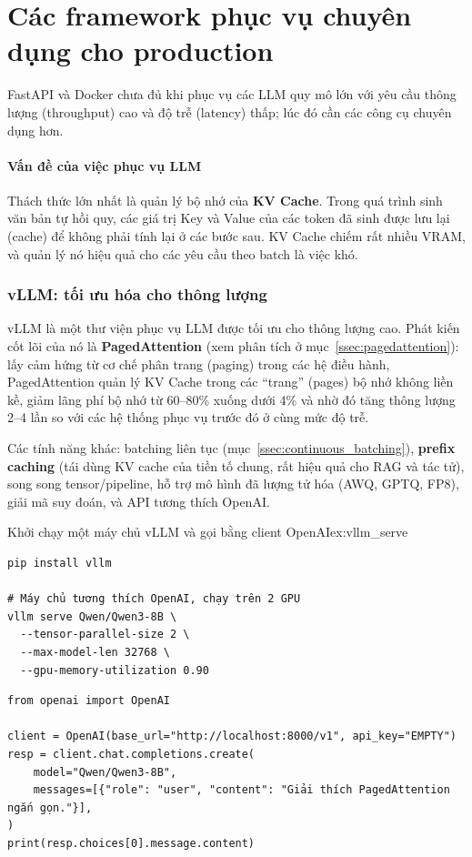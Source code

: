
\section{Các framework phục vụ chuyên dụng cho production}
\label{sec:specialized_serving_frameworks}
FastAPI và Docker chưa đủ khi phục vụ các LLM quy mô lớn với yêu cầu thông lượng (throughput) cao và độ trễ (latency) thấp; lúc đó cần các công cụ chuyên dụng hơn.

\paragraph{Vấn đề của việc phục vụ LLM}
Thách thức lớn nhất là quản lý bộ nhớ của \textbf{KV Cache}. Trong quá trình sinh văn bản tự hồi quy, các giá trị Key và Value của các token đã sinh được lưu lại (cache) để không phải tính lại ở các bước sau. KV Cache chiếm rất nhiều VRAM, và quản lý nó hiệu quả cho các yêu cầu theo batch là việc khó.

\subsubsection{vLLM: tối ưu hóa cho thông lượng}
vLLM là một thư viện phục vụ LLM được tối ưu cho thông lượng cao. Phát kiến cốt lõi của nó là \textbf{PagedAttention} (xem phân tích ở mục~\ref{ssec:pagedattention}): lấy cảm hứng từ cơ chế phân trang (paging) trong các hệ điều hành, PagedAttention quản lý KV Cache trong các “trang” (pages) bộ nhớ không liền kề, giảm lãng phí bộ nhớ từ 60--80\% xuống dưới 4\% và nhờ đó tăng thông lượng 2--4 lần so với các hệ thống phục vụ trước đó ở cùng mức độ trễ.

Các tính năng khác: batching liên tục (mục~\ref{ssec:continuous_batching}), \textbf{prefix caching} (tái dùng KV cache của tiền tố chung, rất hiệu quả cho RAG và tác tử), song song tensor/pipeline, hỗ trợ mô hình đã lượng tử hóa (AWQ, GPTQ, FP8), giải mã suy đoán, và API tương thích OpenAI.

\begin{example}{Khởi chạy một máy chủ vLLM và gọi bằng client OpenAI}{ex:vllm_serve}
\begin{verbatim}
pip install vllm

# Máy chủ tương thích OpenAI, chạy trên 2 GPU
vllm serve Qwen/Qwen3-8B \
  --tensor-parallel-size 2 \
  --max-model-len 32768 \
  --gpu-memory-utilization 0.90
\end{verbatim}
\begin{verbatim}
from openai import OpenAI

client = OpenAI(base_url="http://localhost:8000/v1", api_key="EMPTY")
resp = client.chat.completions.create(
    model="Qwen/Qwen3-8B",
    messages=[{"role": "user", "content": "Giải thích PagedAttention ngắn gọn."}],
)
print(resp.choices[0].message.content)
\end{verbatim}
\end{example}

